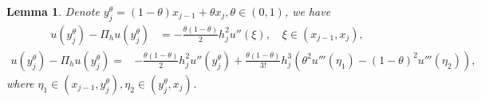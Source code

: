 \documentclass{amsart}
\newtheorem{lemma}[theorem]{Lemma}
\theoremstyle{definition}
\theoremstyle{remark}
\numberwithin{equation}{section}
\begin{document}
\begin{lemma} \label{lmm:Dyj}
  Denote \(y_j^\theta = (1-\theta) x_{j-1} + \theta x_j, \theta\in (0,1)\), we have
  \begin{equation*}
    \begin{aligned}
      u(y_j^\theta) - \Pi_hu(y_j^\theta) & = -\frac{\theta (1-\theta)}{2} h_j^2 u''(\xi), \quad \xi \in (x_{j-1}, x_j),
    \end{aligned}
  \end{equation*}
  \begin{equation*}
    \begin{aligned}
      u(y_j^\theta) - \Pi_hu(y_j^\theta) = & -\frac{\theta (1-\theta)}{2} h_j^2 u''(y_j^\theta)
      + \frac{\theta (1-\theta)}{3!} h_j^3 \left(\theta^2 u'''(\eta_1) - (1-\theta)^2 u'''(\eta_2) \right),
    \end{aligned}
  \end{equation*}
  where \(\eta_1 \in (x_{j-1}, y_j^\theta), \eta_2 \in (y_j^\theta, x_j)\).
\end{lemma}
\end{document}

